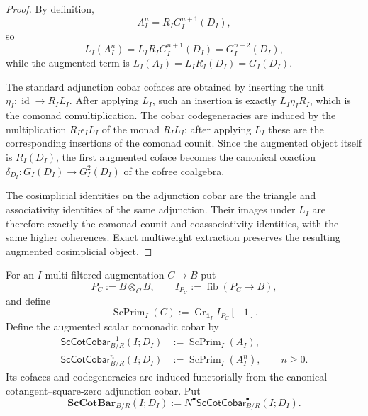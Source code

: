 \begin{proof}
By definition,
\[
    A_I^n=R_IG_I^{n+1}(D_I),
\]
so
\[
    L_I(A_I^n)
    =L_IR_IG_I^{n+1}(D_I)
    =G_I^{n+2}(D_I),
\]
while the augmented term is
$L_I(A_I)=L_IR_I(D_I)=G_I(D_I)$.

The standard adjunction cobar cofaces are obtained by inserting the unit
$\eta_I:\operatorname{id}\to R_IL_I$.  After applying $L_I$, such an
insertion is exactly
$L_I\eta_I R_I$, which is the comonad comultiplication.  The cobar
codegeneracies are induced by the multiplication
$R_I\epsilon_I L_I$ of the monad $R_IL_I$; after applying $L_I$ these are the
corresponding insertions of the comonad counit.  Since the augmented object
itself is $R_I(D_I)$, the first augmented coface becomes the canonical
coaction
$\delta_{D_I}:G_I(D_I)\to G_I^2(D_I)$ of the cofree coalgebra.

The cosimplicial identities on the adjunction cobar are the triangle and
associativity identities of the same adjunction.  Their images under $L_I$
are therefore exactly the comonad counit and coassociativity identities, with
the same higher coherences.  Exact multiweight extraction preserves the
resulting augmented cosimplicial object.
\end{proof}

\begin{definition}
\label{def:as-scalar-comonadic-cobar}
For an $I$-multi-filtered augmentation $C\to B$ put
\[
    P_C:=B\otimes_C B,
    \qquad
    I_{P_C}:=\operatorname{fib}(P_C\to B),
\]
and define
\[
\boxed{
    \operatorname{ScPrim}_I(C)
    :=
    \operatorname{Gr}_{\mathbf1_I}I_{P_C}[-1].
}
\]
Define the augmented scalar comonadic cobar by
\[
\boxed{
\begin{aligned}
    \mathsf{ScCotCobar}^{-1}_{B/R}(I;D_I)
    &:={}
    \operatorname{ScPrim}_I(A_I),\\
    \mathsf{ScCotCobar}^{n}_{B/R}(I;D_I)
    &:={}
    \operatorname{ScPrim}_I(A_I^n),
    \qquad n\geq0.
\end{aligned}}
\]
Its cofaces and codegeneracies are induced functorially from the canonical
cotangent--square-zero adjunction cobar.  Put
\[
\boxed{
    \mathbf{ScCotBar}_{B/R}(I;D_I)
    :=
    N^\bullet
    \mathsf{ScCotCobar}^{\bullet}_{B/R}(I;D_I).
}
\]
\end{definition}

